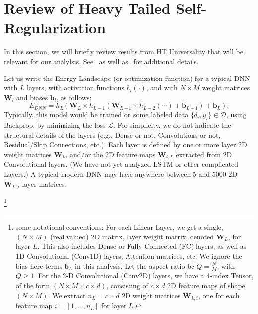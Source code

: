 
\section{Review of Heavy Tailed Self-Regularization}
\label{sxn:theory-review}

In this section, we will briefly review results from HT Universality that will be relevant for our analylsis.
See~\cite{SornetteBook,BouchaudPotters03} as well as~\cite{MM18_TR} for additional details.

Let us write the Energy Landscape (or optimization function) for a typical DNN with $L$ layers, with activation functions $h_{l}(\cdot)$, and with $N\times M$ weight matrices $\mathbf{W}_{l}$ and biases $\mathbf{b}_{l}$, as follows:
\begin{equation}
E_{DNN}=h_{L}(\mathbf{W}_{L}\times h_{L-1}(\mathbf{W}_{L-1}\times h_{L-2}(\cdots)+\mathbf{b}_{L-1})+\mathbf{b}_{L})  .
\label{eqn:dnn_energy}
\end{equation}
Typically, this model would be trained on some labeled data $\{d_{i},y_{i}\}\in\mathcal{D}$, using Backprop, by minimizing the loss $\mathcal{L}$.
For simplicity, we do not indicate the structural details of the layers (e.g., Dense or not, Convolutions or not, Residual/Skip Connections, etc.). 
Each layer is defined by one or more layer 2D weight matrices $\mathbf{W}_{L}$, and/or the 2D feature maps $\mathbf{W}_{i,L}$ extracted from 2D Convolutional layers.
(We have not yet analyzed LSTM or other complicated Layers.) 
A typical modern DNN may have anywhere between 5 and 5000 2D $\mathbf{W}_{L,i}$ layer matrices.  

\footnote{some notational conventions:
For each Linear Layer, we get a  single, $(N\times M)$ (real valued) 2D matrix, layer weight matrix, denoted $\mathbf{W}_{L}$, for layer $L$.  
This also includes Dense or Fully Connected (FC) layers, as well as 1D Convolutional (Conv1D) layers, Attention matrices, etc.
We ignore the bias here terms $\mathbf{b}_{L}$ in this analysis. 
Let the aspect ratio be $Q=\frac{N}{M}$, with $Q\ge 1$.
For the 2-D Convolutional (Conv2D) layers, we have a 4-index Tensor, of the form $(N\times M \times c\times d)$, consisting
of $c\times d$ 2D feature maps of shape $(N\times M)$.    
We  extract $n_{L}=c\times d$  2D  weight matrices $\mathbf{W}_{L,i}$, one for each feature map $i=[1,\dots,n_{L}]$ for layer $L$.
}
   
 


